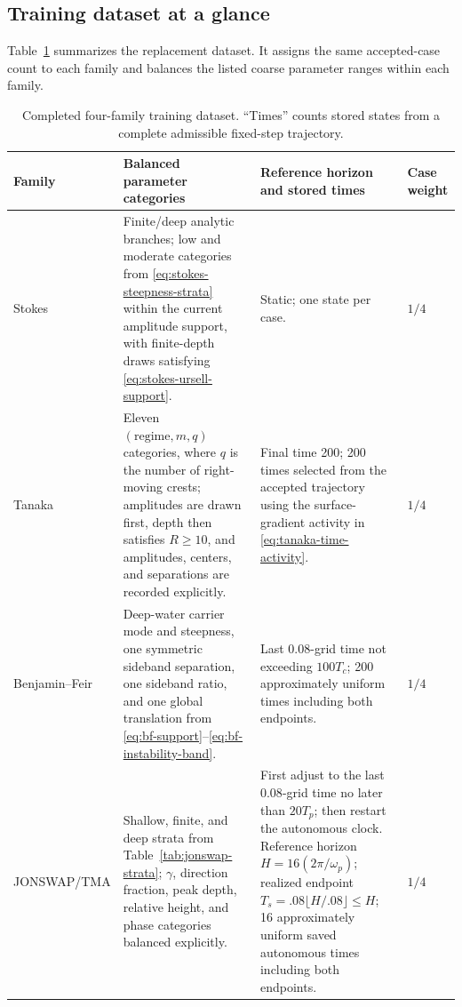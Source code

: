 \documentclass[11pt]{article}
\begin{document}
\subsection{Training dataset at a glance}

Table~\ref{tab:proposed-dataset} summarizes the replacement dataset.  It assigns
the same accepted-case count to each family and balances the listed coarse
parameter ranges within each family.

\begin{table}[ht]
  \centering
  \caption{Completed four-family training dataset.  ``Times'' counts stored states
  from a complete admissible fixed-step trajectory.}
  \label{tab:proposed-dataset}
  \small
  \begin{tabularx}{\textwidth}{
    @{}>{\raggedright\arraybackslash}p{}
       >{\raggedright\arraybackslash}X
       >{\raggedright\arraybackslash}p{}
       >{\raggedright\arraybackslash}p{}@{}}
    \toprule
    Family & Balanced parameter categories & Reference horizon and stored times
        & Case weight \\
    \midrule
    Stokes
      & Finite/deep analytic branches; low and moderate categories from
        \eqref{eq:stokes-steepness-strata} within the current amplitude
        support, with finite-depth draws satisfying
        \eqref{eq:stokes-ursell-support}.
      & Static; one state per case.
      & $1/4$ \\
    Tanaka
      & Eleven $(\mathrm{regime},m,q)$ categories, where $q$ is the number of
        right-moving crests; amplitudes are drawn first, depth then satisfies
        $R\geq10$, and amplitudes, centers, and separations are recorded
        explicitly.
      & Final time 200; 200 times selected from the accepted trajectory using
        the surface-gradient activity in \eqref{eq:tanaka-time-activity}.
      & $1/4$ \\
    Benjamin--Feir
      & Deep-water carrier mode and steepness, one symmetric sideband
        separation, one sideband ratio, and one global translation from
        \eqref{eq:bf-support}--\eqref{eq:bf-instability-band}.
      & Last $0.08$-grid time not exceeding $100T_c$; 200 approximately
        uniform times including both endpoints.
      & $1/4$ \\
    JONSWAP/TMA
      & Shallow, finite, and deep strata from
        Table~\ref{tab:jonswap-strata}; $\gamma$, direction fraction, peak
        depth, relative height, and phase categories balanced explicitly.
      & First adjust to the last \(0.08\)-grid time no later than \(20T_p\);
        then restart the autonomous clock.  Reference horizon
        $H=16(2\pi/\omega_p)$; realized endpoint
        $T_s=.08\lfloor H/.08\rfloor\leq H$; 16 approximately uniform saved
        autonomous times including both endpoints.
      & $1/4$ \\
    \bottomrule
  \end{tabularx}
\end{table}
\end{document}
